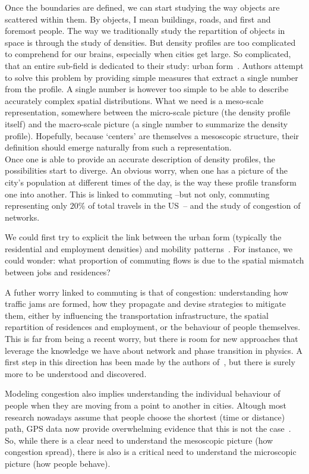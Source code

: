 Once the boundaries are defined, we can start studying the way objects are
scattered within them. By objects, I mean buildings, roads, and first and
foremost people. The way we traditionally study the repartition of objects in
space is through the study of densities. But density profiles are too
complicated to comprehend for our brains, especially when cities get large. So
complicated, that an entire sub-field is dedicated to their study: urban
form~\cite{Tsai:2005,Schwarz:2010,LeNechet:2015}.
Authors attempt to solve this problem by providing simple measures 
that extract a single number from the profile. A single number is however too
simple to be able to describe accurately complex spatial distributions. What we need
is a meso-scale representation, somewhere between the micro-scale picture (the
density profile itself) and the macro-scale picture (a single number to
summarize the density profile). Hopefully, because `centers' are themselves a
mesoscopic structure, their definition should emerge naturally from such a
representation.\\


Once one is able to provide an accurate description of density profiles, the
possibilities start to diverge. An obvious worry, when one has a picture of the
city's population at different times of the day, is the way these profile
transform one into another. This is linked to commuting --but not only,
commuting representing only $20\%$ of total travels in the
US~\cite{FHWA-PL-11-022}-- and the study of congestion of networks. 

We could first try to explicit the link between the urban form (typically the
residential and employment densities) and mobility
patterns~\cite{Ma:2006,Chowdhury:2013}.  For instance, we could wonder: what
proportion of commuting flows is due to the spatial mismatch between jobs and
residences? 

A futher worry linked to commuting is that of congestion:
understanding how traffic jams are formed, how they propagate and devise
strategies to mitigate them, either by influencing the transportation
infrastructure, the spatial repartition of residences and employment, or the
behaviour of people themselves.  This is far from being a recent worry, but
there is room for new approaches that leverage the knowledge we have about
network and phase transition in physics. A first step in this direction has been
made by the authors of~\cite{Li:2015}, but there is surely more to be understood
and discovered.  

Modeling congestion also implies understanding the individual behaviour of
people when they are moving from a point to another in cities. Altough most
research nowadays assume that people choose the shortest (time or distance)
path, GPS data now provide overwhelming evidence that this is not the
case~\cite{Manley:2015}. So, while there is a clear need to understand the mesoscopic
picture (how congestion spread), there is also is a critical need to understand
the microscopic picture (how people behave).\\



